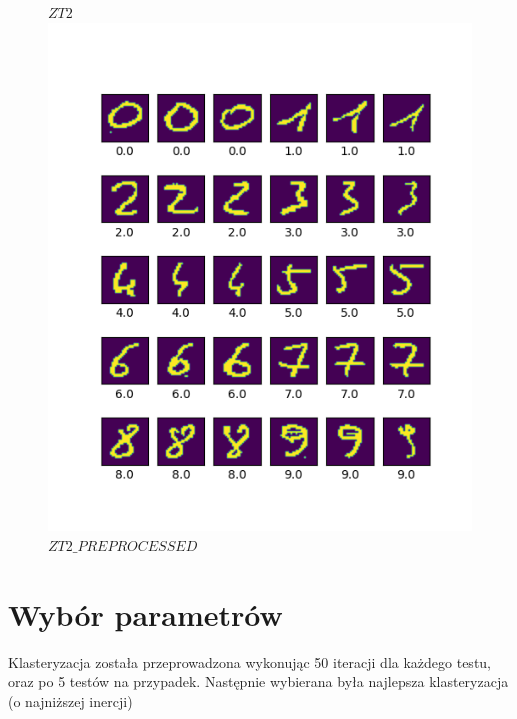 \begin{figure}[!htb]
    $ZT2$
\endminipage\hfill
{}
    \centering
    \includegraphics[width=\linewidth]{dataset_my_preprocessed.png}
    $ZT2\_PREPROCESSED$
\endminipage
\end{figure}

\section*{Wybór parametrów}
Klasteryzacja została przeprowadzona wykonując 50 iteracji dla każdego testu, oraz po 5 testów na przypadek. Następnie wybierana była najlepsza klasteryzacja (o najniższej inercji)

